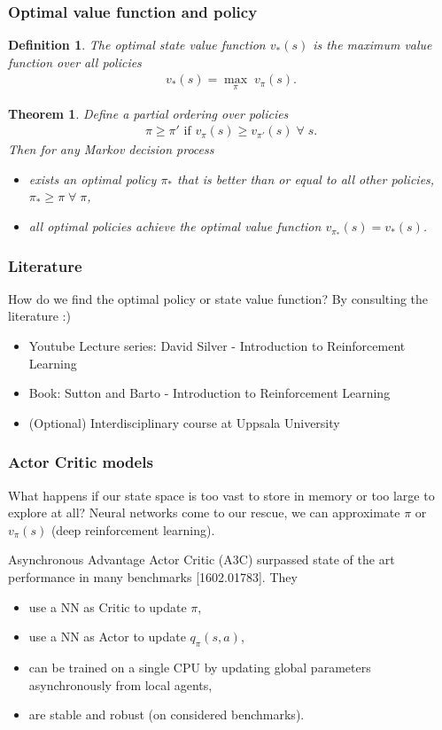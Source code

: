 \documentclass{beamer}
\newtheorem{thm}{Theorem}
\newtheorem{defn}{Definition}
\newcommand{\bi}{\begin{itemize}}
\newcommand{\ei}{\end{itemize}}
\begin{document}
\begin{frame}
\frametitle{Optimal value function and policy}
\begin{defn}
	The optimal state value function $v_*(s)$ is the maximum value function over all policies
	\begin{align}
	v_*(s) = \underset{\pi}{\max} \; v_\pi(s).
	\end{align}
\end{defn}
\begin{thm}
	Define a partial ordering over policies
	\begin{align}
		\pi \geq \pi' \text{ if } v_\pi (s) \geq v_{\pi'}(s) \; \forall \; s.
	\end{align}
	Then for any Markov decision process
	\bi
	\item exists an optimal policy $\pi_*$ that is better than or equal to all other policies, $\pi_* \geq \pi \; \forall \; \pi$,
	\item all optimal policies achieve the optimal value function $v_{\pi_*} (s) = v_* (s)$.
	\ei
\end{thm}
\end{frame}

\begin{frame}
\frametitle{Literature}
How do we find the optimal policy or state value function? By consulting the literature :)
\begin{itemize}
	\item Youtube Lecture series: David Silver - Introduction to Reinforcement Learning
	\item Book: Sutton and Barto - Introduction to Reinforcement Learning
	\item (Optional) Interdisciplinary course at Uppsala University 
\end{itemize}
\end{frame}

\begin{frame}
\frametitle{Actor Critic models}
What happens if our state space is too vast to store in memory or too large to explore at all? Neural networks come to our rescue, we can approximate $\pi$ or $v_\pi(s)$ (deep reinforcement learning).
\pause

Asynchronous Advantage Actor Critic (A3C) surpassed state of the art performance in many benchmarks {\color{blue}[1602.01783]}. They
\begin{itemize}
	\item use a NN as Critic to update $\pi$,
	\item use a NN as Actor to update $q_\pi(s,a)$,
	\item can be trained on a single CPU by updating global parameters asynchronously from local agents,
	\item are stable and robust (on considered benchmarks).
\end{itemize}
\end{frame}
\end{document}
